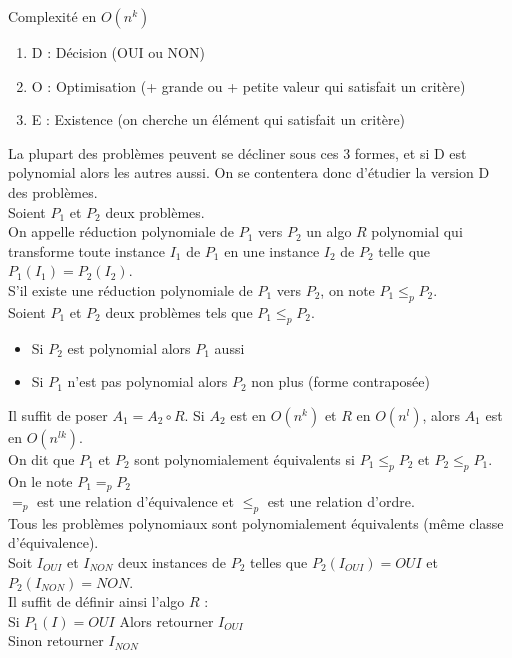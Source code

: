  Complexité en $O(n^k)$

\begin{enumerate}
	\item D : Décision (OUI ou NON)
	\item O : Optimisation (+ grande ou + petite valeur qui satisfait un critère)
	\item E : Existence (on cherche un élément qui satisfait un critère)
\end{enumerate}
La plupart des problèmes peuvent se décliner sous ces 3 formes, et si D est polynomial alors les autres aussi. On se contentera donc d'étudier la version D des problèmes. \\

 Soient $P_1$ et $P_2$ deux problèmes.\\
On appelle réduction polynomiale de $P_1$ vers $P_2$ un algo $R$ polynomial qui transforme toute instance $I_1$ de $P_1$ en une instance $I_2$ de $P_2$ telle que $P_1(I_1) = P_2(I_2)$. \\
S'il existe une réduction polynomiale de $P_1$ vers $P_2$, on note $P_1 \leq_p P_2$. \\

 Soient $P_1$ et $P_2$ deux problèmes tels que $P_1 \leq_p P_2$.
\begin{itemize}
	\item Si $P_2$ est polynomial alors $P_1$ aussi
	\item Si $P_1$ n'est pas polynomial alors $P_2$ non plus (forme contraposée)
\end{itemize}

 Il suffit de poser $A_1 = A_2 \circ R$. Si $A_2$ est en $O(n^k)$ et $R$ en $O(n^l)$, alors $A_1$ est en $O(n^{lk})$. \\

 On dit que $P_1$ et $P_2$ sont polynomialement équivalents si $P_1 \leq_p P_2$ et $P_2 \leq_p P_1$. On le note $P_1 =_p P_2$\\

 $=_p$ est une relation d'équivalence et $\leq_p$ est une relation d'ordre. \\

 Tous les problèmes polynomiaux sont polynomialement équivalents (même classe d'équivalence). \\

 Soit $I_{OUI}$ et $I_{NON}$ deux instances de $P_2$ telles que $P_2(I_{OUI}) = OUI$ et $P_2(I_{NON}) = NON$. \\
Il suffit de définir ainsi l'algo $R$ : \\Si $P_1(I) = OUI$ Alors retourner $I_{OUI}$ \\ Sinon retourner $I_{NON}$
